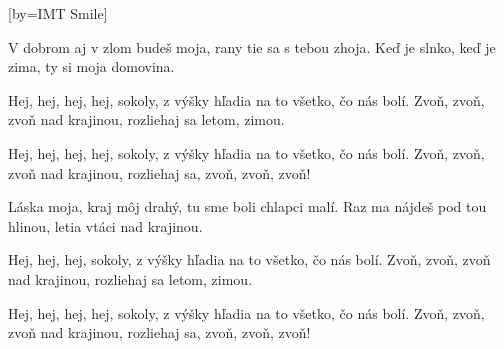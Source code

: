 [by={IMT Smile}]

\beginverse{}
V dobrom aj v zlom budeš moja,
rany tie sa s tebou zhoja.
Keď je slnko, keď je zima,
ty si moja domovina.
\endverse{}

\beginchorus{}
Hej, hej, hej, hej, sokoly,
z výšky hľadia na to všetko, čo nás bolí.
Zvoň, zvoň, zvoň nad krajinou,
rozliehaj sa letom, zimou.
\endchorus{}

\beginchorus{}
Hej, hej, hej, hej, sokoly,
z výšky hľadia na to všetko, čo nás bolí.
Zvoň, zvoň, zvoň nad krajinou,
rozliehaj sa, zvoň, zvoň, zvoň!
\endchorus{}

\beginverse{}
Láska moja, kraj môj drahý,
tu sme boli chlapci malí.
Raz ma nájdeš pod tou hlinou,
letia vtáci nad krajinou.
\endverse{}

\beginchorus{}
Hej, hej, hej, sokoly,
z výšky hľadia na to všetko, čo nás bolí.
Zvoň, zvoň, zvoň nad krajinou,
rozliehaj sa letom, zimou.
\endchorus{}

\beginchorus{}
Hej, hej, hej, hej, sokoly,
z výšky hľadia na to všetko, čo nás bolí.
Zvoň, zvoň, zvoň nad krajinou,
rozliehaj sa, zvoň, zvoň, zvoň!
\endchorus{}

\endsong{}
